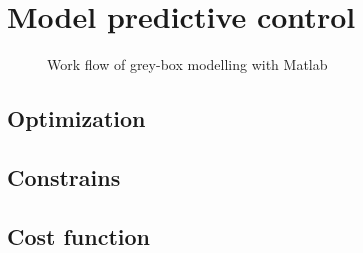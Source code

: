 \chapter{Model predictive control}
\label{ch:mpc}
\begin{figure}[h]
            \centering
            \def\svgwidth{400pt}
            
            \caption{Work flow of grey-box modelling with Matlab}
            \label{fig:workflowModel}
    \end{figure}
\section{Optimization}
\label{section:optimization}
\section{Constrains}
\label{section:constrains}
\section{Cost function}
\label{section:costfunction}
